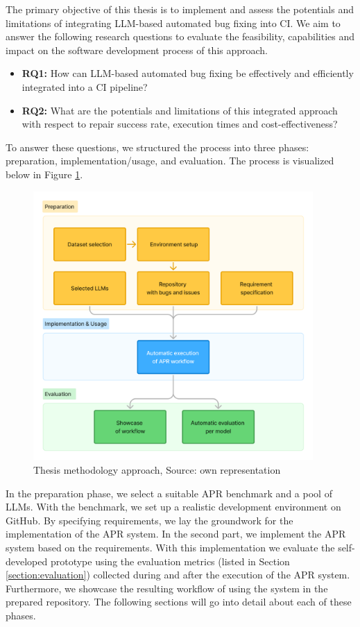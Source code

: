 The primary objective of this thesis is to implement and assess the potentials and limitations of integrating LLM-based automated bug fixing into \ac{CI}. We aim to answer the following research questions to evaluate the feasibility, capabilities and impact on the software development process of this approach.

\begin{itemize}
    \item \textbf{RQ1:} How can LLM-based automated bug fixing be effectively and efficiently integrated into a CI pipeline?
    \item \textbf{RQ2:} What are the potentials and limitations of this integrated approach with respect to repair success rate, execution times and cost-effectiveness?
\end{itemize}

To answer these questions, we structured the process into three phases: preparation, implementation/usage, and evaluation. The process is visualized below in Figure \ref{fig:method-overview}.

\begin{figure}[H]
    \centering
    \includegraphics[width=0.95\textwidth]{images/flowcharts/method.png}
    \caption{Thesis methodology approach, Source: own representation}
    \label{fig:method-overview}
\end{figure}

In the preparation phase, we select a suitable \ac{APR} benchmark and a pool of \acp{LLM}. With the benchmark, we set up a realistic development environment on GitHub. By specifying requirements, we lay the groundwork for the implementation of the APR system.
In the second part, we implement the \ac{APR} system based on the requirements.
With this implementation we evaluate the self-developed prototype using the evaluation metrics (listed in Section \ref{section:evaluation}) collected during and after the execution of the APR system. Furthermore, we showcase the resulting workflow of using the system in the prepared repository.
The following sections will go into detail about each of these phases.

